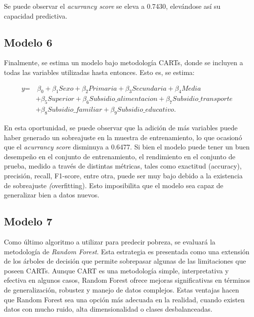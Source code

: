 \documentclass[11pt, a4paper]{article}
\begin{document}
Se puede observar el \textit{acurrancy score} se eleva a 0.7430, elevándose así su capacidad predictiva. 


\subsection*{Modelo 6}

Finalmente, se estima un modelo bajo metodología CARTs, donde se incluyen a todas las variables utilizadas hasta entonces. Esto es, se estima:

\[
\begin{aligned}
\textit{y} = &\ \beta_0  + \beta_1 \textit{Sexo} + \beta_2 \textit{Primaria} 
+ \beta_3 \textit{Secundaria} + \beta_4 \textit{Media} \\
& + \beta_5 \textit{Superior} + \beta_6 \textit{Subsidio\_alimentacion} 
+ \beta_7 \textit{Subsidio\_transporte} \\
& + \beta_8 \textit{Subsidio\_familiar} + \beta_{9} \textit{Subsidio\_educativo}.
\end{aligned}
\]

En esta oportunidad, se puede observar que la adición de más variables puede haber generado un sobreajuste en la muestra de entrenamiento, lo que ocasionó que el \textit{acurrancy score} disminuya  a 0.6477. Si bien el modelo puede tener un buen desempeño en el conjunto de entrenamiento, el rendimiento en el conjunto de prueba, medido a través de distintas métricas, tales como exactitud (accuracy), precisión, recall, F1-score, entre otra, puede ser muy bajo debido a la existencia de sobreajuste \textit(overfitting). Esto imposibilita que el modelo sea capaz de generalizar bien a datos nuevos. 


\subsection*{Modelo 7}

Como último algoritmo a utilizar para predecir pobreza, se evaluará la metodología de \textit{Random Forest}.  Esta estrategia es presentada como una extensión de los árboles de decisión que permite sobrepasar algunas de las limitaciones que poseen CARTs. Aunque CART es una metodología simple, interpretativa y efectiva en algunos casos, Random Forest ofrece mejoras significativas en términos de generalización, robustez y manejo de datos complejos. Estas ventajas hacen que Random Forest sea una opción más adecuada en la realidad, cuando existen datos con mucho ruido, alta dimensionalidad o clases desbalanceadas. 
\end{document}
